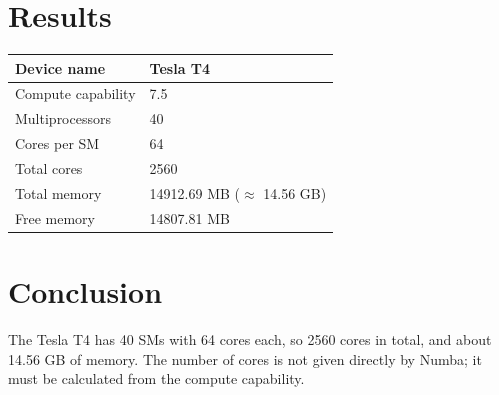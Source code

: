 \documentclass[11pt,a4paper]{article}
\begin{document}
\section{Results}
\begin{center}
\begin{tabular}{|l|l|}
\hline
Device name        & Tesla T4 \\ \hline
Compute capability & 7.5 \\ \hline
Multiprocessors    & 40 \\ \hline
Cores per SM       & 64 \\ \hline
Total cores        & 2560 \\ \hline
Total memory       & 14912.69 MB ($\approx$ 14.56 GB) \\ \hline
Free memory        & 14807.81 MB \\ \hline
\end{tabular}
\end{center}

\section{Conclusion}
The Tesla T4 has 40 SMs with 64 cores each, so 2560 cores in total,
and about 14.56 GB of memory. The number of cores is not given
directly by Numba; it must be calculated from the compute capability.
\end{document}
